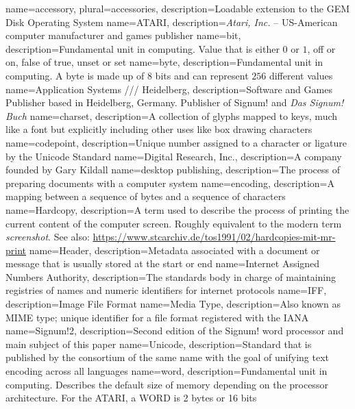   {name=accessory, plural=accessories, description={Loadable extension to the GEM Disk Operating System}}
  {name={ATARI}, description={\textit{Atari, Inc.} – US-American computer manufacturer and games publisher}}
  {name={bit}, description={Fundamental unit in computing. Value that is either $0$ or $1$, off or on, false of true, unset or set}}
  {name={byte}, description={Fundamental unit in computing. A byte is made up of 8 bits and can represent $256$ different values}}
  {name={Application Systems /// Heidelberg}, description={Software and Games Publisher based in Heidelberg, Germany. Publisher of Signum! and \textit{Das Signum! Buch}}}
  {name=charset, description={A collection of glyphs mapped to keys, much like a font but explicitly including other uses like box drawing characters}}
  {name=codepoint, description={Unique number assigned to a character or ligature by the Unicode Standard}}
  {name={Digital Research, Inc.}, description={A company founded by Gary Kildall}}
  {name={desktop publishing}, description={The process of preparing documents with a computer system}}
  {name=encoding, description={A mapping between a sequence of bytes and a sequence of characters}}
  {name=Hardcopy, description={A term used to describe the process of printing the current content of the computer screen. Roughly equivalent to the modern term \textit{screenshot}. See also: \url{https://www.stcarchiv.de/tos1991/02/hardcopies-mit-mr-print}}}
  {name={Header}, description={Metadata associated with a document or message that is usually stored at the start or end}}
  {name={Internet Assigned Numbers Authority}, description={The standards body in charge of maintaining registries of names and numeric identifiers for internet protocols}}
  {name={IFF}, description={Image File Format}}
  {name={Media Type}, description={Also known as MIME type; unique identifier for a file format registered with the IANA}}
  {name={Signum!2}, description={Second edition of the Signum! word processor and main subject of this paper}}
  {name={Unicode}, description={Standard that is published by the consortium of the same name with the goal of unifying text encoding across all languages}}
  {name={word}, description={Fundamental unit in computing. Describes the default size of memory depending on the processor architecture. For the ATARI, a WORD is 2 bytes or 16 bits}}